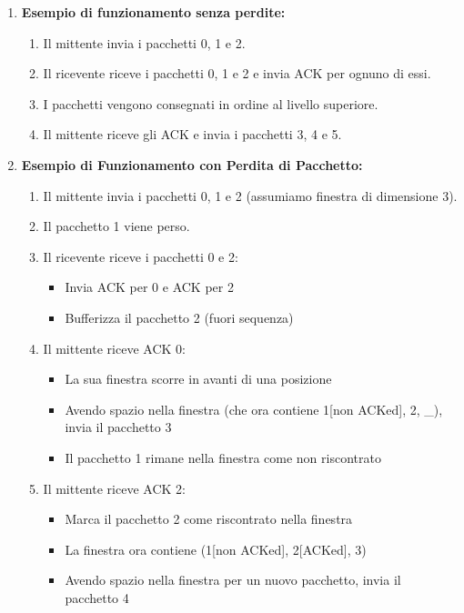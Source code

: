 \begin{enumerate}
  \item \textbf{Esempio di funzionamento senza perdite:}
  \begin{enumerate}
    \item Il mittente invia i pacchetti 0, 1 e 2.
    \item Il ricevente riceve i pacchetti 0, 1 e 2 e invia ACK per ognuno di essi.
    \item I pacchetti vengono consegnati in ordine al livello superiore.
    \item Il mittente riceve gli ACK e invia i pacchetti 3, 4 e 5.
  \end{enumerate}
  \item \textbf{Esempio di Funzionamento con Perdita di Pacchetto:}
  \begin{enumerate}
       \item Il mittente invia i pacchetti 0, 1 e 2 (assumiamo finestra di dimensione 3).
       \item Il pacchetto 1 viene perso.
       \item Il ricevente riceve i pacchetti 0 e 2:
           \begin{itemize}
               \item Invia ACK per 0 e ACK per 2
               \item Bufferizza il pacchetto 2 (fuori sequenza)
           \end{itemize}
       \item Il mittente riceve ACK 0:
           \begin{itemize}
               \item La sua finestra scorre in avanti di una posizione
               \item Avendo spazio nella finestra (che ora contiene 1[non ACKed], 2, \_), invia il pacchetto 3
               \item Il pacchetto 1 rimane nella finestra come non riscontrato
           \end{itemize}
       \item Il mittente riceve ACK 2:
           \begin{itemize}
               \item Marca il pacchetto 2 come riscontrato nella finestra
               \item La finestra ora contiene (1[non ACKed], 2[ACKed], 3)
               \item Avendo spazio nella finestra per un nuovo pacchetto, invia il pacchetto 4
           \end{itemize}

\end{enumerate}
\end{enumerate}

